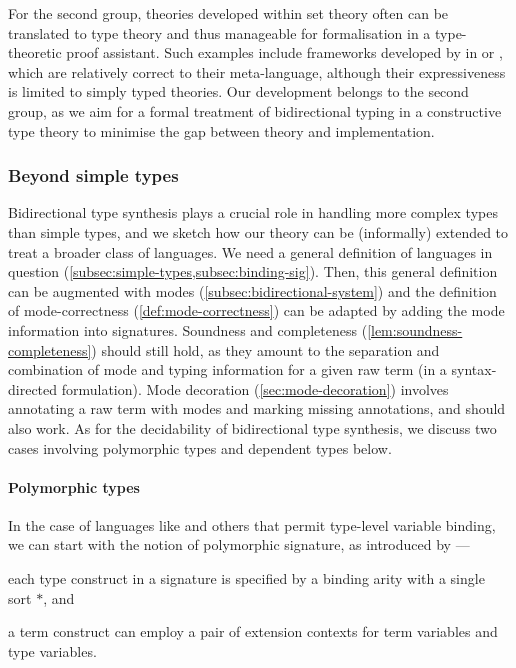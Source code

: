 For the second group, theories developed within set theory often can be translated to type theory and thus manageable for formalisation in a type-theoretic proof assistant. 
Such examples include frameworks developed by \citet{Ahrens2022,Allais2021,Fiore2022} in \Coq or \Agda, which are relatively correct to their meta-language, although their expressiveness is limited to simply typed theories.
Our development belongs to the second group, as we aim for a formal treatment of bidirectional typing in a constructive type theory to minimise the gap between theory and implementation.

\subsubsection{Beyond simple types}

Bidirectional type synthesis plays a crucial role in handling more complex types than simple types, and we sketch how our theory can be (informally) extended to treat a broader class of languages.
We need a general definition of languages in question (\cref{subsec:simple-types,subsec:binding-sig}).
Then, this general definition can be augmented with modes (\cref{subsec:bidirectional-system}) and the definition of mode-correctness (\cref{def:mode-correctness}) can be adapted by adding the mode information into signatures.
Soundness and completeness (\cref{lem:soundness-completeness}) should still hold, as they amount to the separation and combination of mode and typing information for a given raw term (in a syntax-directed formulation).
Mode decoration (\cref{sec:mode-decoration}) involves annotating a raw term with modes and marking missing annotations, and should also work.
As for the decidability of bidirectional type synthesis, we discuss two cases involving polymorphic types and dependent types below.

\paragraph{Polymorphic types}
In the case of languages like \SystemF and others that permit type-level variable binding, we can start with the notion of polymorphic signature, as introduced by \citet{Hamana2011}---\begin{inlineenum}
  \item each type construct in a signature is specified by a binding arity with a single sort $*$, and
  \item a term construct can employ a pair of extension contexts for term variables and type variables.
\end{inlineenum}

